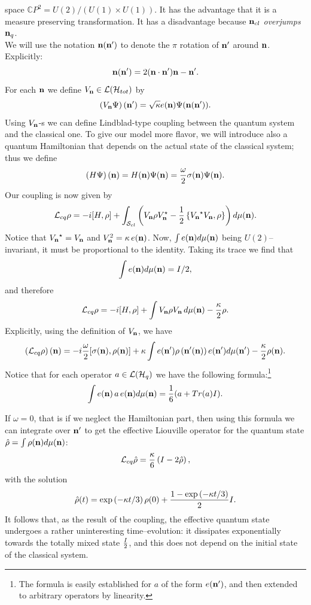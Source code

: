 \documentclass[12pt]{article}
\def\complex{{\mathbb C}}
\def\be{\begin{equation}} \def\ee{\end{equation}}
\begin{document}
space $\complex P^2=U (2)/ (U (1)\times U (1))$. 
It has
the advantage that it is a measure preserving transformation.  It has
a disadvantage because ${\bf n}_{cl}$ {\em overjumps} ${\bf n}_q$.  \\
We will
use the notation ${\bf n} ({\bf n}')$ to denote the $\pi$ rotation of 
${\bf n}'$ around ${\bf n}$.  Explicitly: 
$${\bf n} ({\bf n}')=2 ({\bf n\cdot n}'){\bf n}-{\bf n}' . $$
For each ${\bf n}$ we define $V_{\bf n}\in {\cal L} ({\cal H}_{tot})$
by
\be
\left ( V_{\bf n}\Psi\right)
 ({\bf n}')=\sqrt{\kappa} e ({\bf n})\Psi ({\bf n} (
{\bf n}')). 
\ee
Using $V_{\bf n}$-s we can define Lindblad-type coupling between the quantum 
system and the classical one.  To give our model more flavor,  we will
introduce also a quantum Hamiltonian that depends on the actual state
of the classical system; thus we define
\be
\left ( H\Psi\right) ({\bf n})=
H ({\bf n})\Psi ({\bf n}) = {\omega\over2}\sigma  ({\bf n})\Psi  ({\bf n}). 
\ee
Our coupling is now given by
\be
{\cal L}_{cq} \rho = -i[H, \rho ] +\int_{{\cal S}_{cl}} \left ( V_{\bf n}\rho
V_{\bf n}^{\star}-{1\over2}
\left\{ {V_{\bf n}}^{\star} V_{\bf n}, \rho\right\}\right) d\mu  ({\bf n}). 
\ee 
Notice that ${V_{\bf n}}^{\star}=
V_{\bf n}$ and $V_{\bf n}^2=\kappa\,  e ({\bf n})$. 
Now, 
$\int e ({\bf n}) d\mu  ({\bf n})$ being $U (2)$--invariant,  it must be
proportional to the identity.  Taking its trace we find that
$$\int e ({\bf n}) d\mu  ({\bf n}) = I/2 , $$  
and therefore
\be
{\cal L}_{cq}\rho=-i[H, \rho]+\int  V_{\bf
n}\rho V_{\bf n}\,  d\mu  ({\bf n}) -{\kappa\over 2} \rho . 
\ee 
Explicitly,  using the definition of $V_{\bf n}$,  we have
\be
 \left ({\cal L}_{cq}\rho\right) ({\bf n}) =
 -i{\omega\over2}[\sigma ({\bf n}), \rho ({\bf n})]+
 \kappa\int e ({\bf n'})\rho\left ({\bf
n'}  ({\bf n})\right)e ({\bf n'}) d\mu  ({\bf n'}) -{\kappa\over 2} \rho ({\bf n}). 
\ee
Notice that for each operator $a\in{\cal L} ({\cal H}_q)$
we have the following formula:\footnote{The formula 
is easily established for $a$
of the form $e ({\bf n'})$,  and 
then extended to arbitrary operators by linearity. }
\be
\int e ({\bf n})\,  a\,  e ({\bf n}) d\mu  ({\bf n})={1\over 6} (a+Tr (a)I). 
\ee

If $\omega=0$,  that is if we neglect the Hamiltonian part,  then
using this formula we can integrate
over $ {\bf n'}$ to get the effective Liouville operator for the
quantum state ${\hat\rho}=\int \rho ({\bf n}) d\mu  ({\bf
n})$: 
\be
 {\cal L}_{cq}{\hat\rho}={\kappa\over6}\left (I-2{\hat\rho}\right), 
\ee
with the solution
\be
{\hat\rho} (t)=\exp\left ({-\kappa t}/3\right)\rho (0)+{1-\exp\left ({-\kappa
t}/3\right)\over 2}I. 
\ee
It follows that,  as the result of the coupling,  the effective quantum state
undergoes a rather uninteresting time--evolution:  it
dissipates exponentially towards the totally mixed state ${I\over2}$,  and this
 does not depend on the initial state of the classical system.
\end{document}
